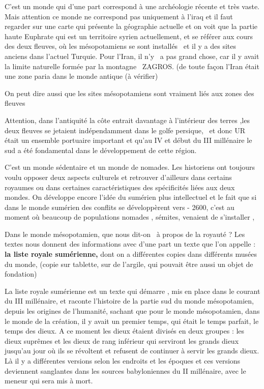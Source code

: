 \documentclass[a4paper]{article}
\begin{document}
\bigskip

{
C'est un monde qui d'une part correspond à une archéologie récente et
très vaste. Mais attention ce monde ne correspond pas uniquement à
l'iraq et il faut regarder sur une carte qui présente la géographie
actuelle et on voit que la partie haute Euphrate qui est un territoire
syrien actuellement, et se référer aux cours des deux fleuves, où les
mésopotamiens se sont installés \ et il y a des sites anciens dans
l'actuel Turquie. Pour l'Iran, il n'y \ a pas grand chose, car il y
avait la limite naturelle formée par la montagne \ ZAGROS. (de toute
façon l'Iran était une zone paria dans le monde antique (à vérifier)}


\bigskip

{
On peut dire aussi que les sites mésopotamiens sont vraiment liés aux
zones des fleuves}

{
Attention, dans l'antiquité la côte entrait davantage à l'intérieur des
terres ,les deux fleuves se jetaient indépendamment dans le golfe
persique, \ et donc UR était un ensemble portuaire important et qu'au
IV et début du III millénaire le sud a été fondamental dans le
développement de cette région. }


\bigskip

{
C'est un monde sédentaire et un monde de nomades. Les historiens ont
toujours voulu opposer deux aspects culturels et retrouver d'ailleurs
dans certains royaumes ou dans certaines caractéristiques des
spécificités liées aux deux mondes. On développe encore l'idée du
sumérien plus intellectuel et le fait que si dans le monde sumérien des
conflits se développèrent vers - 2600, c'est au moment où beaucoup de
populations nomades , sémites, venaient de s'installer , }


\bigskip


\bigskip

{
Dans le monde mésopotamien, que nous dit-on \ à propos de la royauté ?
Les textes nous donnent des informations avec d'une part un texte que
l'on appelle : \textbf{la liste royale sumérienne, }dont on a
différentes copies dans différents musées du monde, (copie sur
tablette, sur de l'argile, qui pouvait être aussi un objet de
fondation)}

{
La liste royale sumérienne est un texte qui démarre , mis en place dans
le courant du III millénaire, et raconte l'histoire de la partie sud du
monde mésopotamien, depuis les origines de l'humanité, sachant que pour
le monde mésopotamien, dans le monde de la création, il y avait un
premier temps, qui était le temps parfait, le temps des dieux. A ce
moment les dieux étaient divisés en deux groupes : les dieux suprêmes
et les dieux de rang inférieur qui serviront les grands dieux jusqu'au
jour où ils se révoltent et refusent de continuer à servir les grands
dieux. Là il y a différentes versions selon les endroits et les époques
et ces versions deviennent sanglantes dans les sources babyloniennes du
II millénaire, avec le meneur qui sera mis à mort.}
\end{document}
